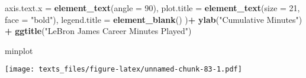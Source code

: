 \documentclass[]{book}
\newenvironment{Shaded}{\begin{snugshade}}{\end{snugshade}}
\newcommand{\DataTypeTok}[1]{\textcolor[rgb]{0.13,0.29,0.53}{#1}}
\newcommand{\DecValTok}[1]{\textcolor[rgb]{0.00,0.00,0.81}{#1}}
\newcommand{\KeywordTok}[1]{\textcolor[rgb]{0.13,0.29,0.53}{\textbf{#1}}}
\newcommand{\NormalTok}[1]{#1}
\newcommand{\OperatorTok}[1]{\textcolor[rgb]{0.81,0.36,0.00}{\textbf{#1}}}
\newcommand{\StringTok}[1]{\textcolor[rgb]{0.31,0.60,0.02}{#1}}
\begin{document}
\begin{Shaded}
\begin{Highlighting}[]
        \DataTypeTok{axis.text.x =} \KeywordTok{element_text}\NormalTok{(}\DataTypeTok{angle =} \DecValTok{90}\NormalTok{),}
        \DataTypeTok{plot.title =} \KeywordTok{element_text}\NormalTok{(}\DataTypeTok{size =} \DecValTok{21}\NormalTok{, }\DataTypeTok{face =} \StringTok{"bold"}\NormalTok{),}
        \DataTypeTok{legend.title =} \KeywordTok{element_blank}\NormalTok{()}
\NormalTok{        )}\OperatorTok{+}\StringTok{ }
\StringTok{  }\KeywordTok{ylab}\NormalTok{(}\StringTok{"Cumulative Minutes"}\NormalTok{) }\OperatorTok{+}\StringTok{ }
\StringTok{  }\KeywordTok{ggtitle}\NormalTok{(}\StringTok{"LeBron James Career Minutes Played"}\NormalTok{)}

\NormalTok{minplot}
\end{Highlighting}
\end{Shaded}

\texttt{[image: texts\_files/figure-latex/unnamed-chunk-83-1.pdf]}
\end{document}
